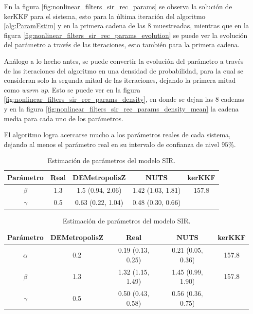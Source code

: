 En la figura \ref{fig:nonlinear_filters_sir_rec_params} se observa la solución de kerKKF para el sistema, esto para la última iteración del algoritmo \ref{alg:ParamEstim} y en la primera cadena de las $8$ muestreadas, mientras que en la figura \ref{fig:nonlinear_filters_sir_rec_params_evolution} se puede ver la evolución del parámetro a través de las iteraciones, esto también para la primera cadena.

Análogo a lo hecho antes, se puede convertir la evolución del parámetro a través de las iteraciones del algoritmo en una densidad de probabilidad, para la cual se consideran solo la segunda mitad de las iteraciones, dejando la primera mitad como \textit{warm up}. Esto se puede ver en la figura \ref{fig:nonlinear_filters_sir_rec_params_density}, en donde se dejan las $8$ cadenas y en la figura \ref{fig:nonlinear_filters_sir_rec_params_density_mean} la cadena media para cada uno de los parámetros.

El algoritmo logra acercarse mucho a los parámetros reales de cada sistema, dejando al menos el parámetro real en su intervalo de confianza de nivel $95$\%.

\begin{table}[h!]
    \centering
    \caption{Estimación de parámetros del modelo SIR.} 
    \begin{tabular}{|c|c|c|c|c|}
    \hline
    \textbf{Parámetro} & \textbf{Real} & \textbf{DEMetropolisZ} & \textbf{NUTS} & \textbf{kerKKF}  \\ \hline
    $\beta$ & 1.3 & 1.5 (0.94, 2.06) & 1.42 (1.03, 1.81) & 157.8 \\ \hline
    $\gamma$ & 0.5 & 0.63 (0.22, 1.04) & 0.48 (0.30, 0.66) & \\ \hline
    \end{tabular}
    \label{tab:SIR_params}
\end{table}

\begin{table}[h!]
    \centering
    \caption{Estimación de parámetros del modelo SIR.} 
    \begin{tabular}{|c|c|c|c|c|}
    \hline
    \textbf{Parámetro}& \textbf{DEMetropolisZ} & \textbf{Real} & \textbf{NUTS} & \textbf{kerKKF}  \\ \hline
    $\alpha$ & 0.2 & 0.19 (0.13, 0.25) & 0.21 (0.05, 0.36) & 157.8 \\ \hline
    $\beta$ & 1.3 & 1.32 (1.15, 1.49) & 1.45 (0.99, 1.90) & 157.8 \\ \hline
    $\gamma$ & 0.5 & 0.50 (0.43, 0.58) & 0.56 (0.36, 0.75) & \\ \hline
    \end{tabular}
    \label{tab:SIR_params}
\end{table}

